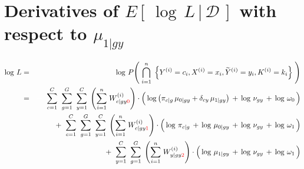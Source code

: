 

\section{Derivatives of $E\!\left[\,\left.\log\,L\,\right\vert\,\mathcal{D}\,\right]$ with respect to $\mu_{1 \vert gy}$}
\setcounter{theorem}{0}
\setcounter{equation}{0}

\renewcommand{\theenumi}{\roman{enumi}}
\renewcommand{\labelenumi}{\textnormal{(\theenumi)}$\;\;$}

\begin{eqnarray*}
\log\,L
	&=&
	\log\,P\!\left(\;
		\overset{n}{\underset{i=1}{\bigcap}}\;
		\left\{
			Y^{(i)}=c_{i},X^{(i)}=x_{i},\widetilde{Y}^{(i)}=y_{i},K^{(i)}=k_{i}
		\right\}
	\;\right)
\\
&=&
	{\color{white}+} \;\;
	\overset{C}{\underset{c=1}{\sum}}\;\;
	\overset{G}{\underset{g=1}{\sum}}\;\;
	\overset{C}{\underset{y=1}{\sum}}\;
	\left(\overset{n}{\underset{i=1}{\sum}}\;W^{(i)}_{c \vert gy{\color{red}0}}\right)
	\cdot
	\left(\,
		\log\left(\pi_{c \vert g}\,\mu_{0 \vert gy} + \delta_{cy}\,\mu_{1\vert gy}\right)
		\,\overset{{\color{white}.}}{+}\,
		\log\,\nu_{gy}
		\,\overset{{\color{white}.}}{+}\,
		\log\,\omega_{0}
	\,\right)
\\
&&
	+ \;\;
	\overset{C}{\underset{c=1}{\sum}}\;\;
	\overset{G}{\underset{g=1}{\sum}}\;\;
	\overset{C}{\underset{y=1}{\sum}}\;
	\left(\overset{n}{\underset{i=1}{\sum}}\;W^{(i)}_{c \vert gy{\color{red}1}}\right)
	\cdot
	\left(\,
		\log\,\pi_{c \vert g}
		\,\overset{{\color{white}.}}{+}\,
		\log\,\mu_{0\vert gy}
		\,\overset{{\color{white}.}}{+}\,
		\log\,\nu_{gy}
		\,\overset{{\color{white}.}}{+}\,
		\log\,\omega_{1}
	\,\right)
\\
&&
	+ \;\;
	\overset{C}{\underset{y=1}{\sum}}\;\;
	\overset{G}{\underset{g=1}{\sum}}\;
	\left(\overset{n}{\underset{i=1}{\sum}}\;W^{(i)}_{y \vert gy{\color{red}2}}\right)
	\cdot
	\left(\,
		\log\,\mu_{1 \vert gy}
		\,\overset{{\color{white}.}}{+}\,
		\log\,\nu_{gy}
		\,\overset{{\color{white}.}}{+}\,
		\log\,\omega_{1}
	\,\right)
\end{eqnarray*}

